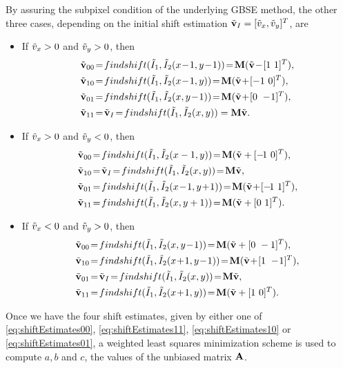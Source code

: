 By assuring the subpixel condition of the underlying GBSE method, the other three cases, depending on the initial shift estimation $\tilde{\mathbf{v}}_I = [\tilde{v}_x, \tilde{v}_y]^T$, are
\begin{itemize}
	\item If $\tilde{v}_x > 0$ and $\tilde{v}_y > 0$, then
	\begin{align}
	\nonumber \nbv_{00}\!&=\!findshift(\nI_1, \nI_2(x\!-\!1,y\!-\!1))\!=\!\bM(\nbv\!-\![1 \ 1]^T),\\ 
	\nonumber \nbv_{10}\!&=\!findshift(\nI_1, \nI_2(x\!-\!1,y))\!=\!\bM(\nbv\!+\![-1 \ 0]^T),\\
	\nonumber \nbv_{01}\!&=\!findshift(\nI_1, \nI_2(x,y\!-\!1))\!=\!\bM(\nbv\!+\![0 \ -\!1]^T),\\
	\nbv_{11}\!&=\!\nbv_I\!=\!findshift(\nI_1, \nI_2(x,y)) = \bM\nbv.
	\label{eq:shiftEstimates11}
	\end{align}
	
	\item If $\tilde{v}_x > 0$ and $\tilde{v}_y < 0$, then
	\begin{align}
	\nonumber \nbv_{00}\!&=\!findshift(\nI_1, \nI_2(x-1,y))\!=\!\bM(\nbv+ [-\!1 \ 0]^T),\\ 
	\nonumber \nbv_{10}\!&=\!\nbv_I\!=\!findshift(\nI_1, \nI_2(x,y))\!=\!\bM\nbv,\\
	\nonumber \nbv_{01}\!&=\!findshift(\nI_1, \nI_2(x\!-\!1,y\!+\!1))\!=\!\bM(\nbv\!+\![-\!1 \ 1]^T),\\
	\nbv_{11}\!&=\!findshift(\nI_1, \nI_2(x,y+1))\!=\!\bM(\nbv + [0 \ 1]^T).
	\label{eq:shiftEstimates10}
	\end{align}
	
	\item If $\tilde{v}_x < 0$ and $\tilde{v}_y > 0$, then
	\begin{align}
	\nonumber \nbv_{00}\!&=\!findshift(\nI_1, \nI_2(x,y\!-\!1))\!=\!\bM(\nbv+ [0 \ -1]^T),\\ 
	\nonumber \nbv_{10}\!&=\!findshift(\nI_1, \nI_2(x\!+\!1,y\!-\!1))\!=\!\bM(\nbv\!+\![1 \ -\!1]^T),\\
	\nonumber \nbv_{01}\!&=\!\nbv_I\!=\!findshift(\nI_1, \nI_2(x,y))\!=\!\bM\nbv,\\
	\nbv_{11}\!&=\!findshift(\nI_1, \nI_2(x\!+\!1,y))\!=\!\bM(\nbv + [1 \ 0]^T).
	\label{eq:shiftEstimates01}
	\end{align}
\end{itemize}
Once we have the four shift estimates, given by either one of \eqref{eq:shiftEstimates00}, \eqref{eq:shiftEstimates11}, \eqref{eq:shiftEstimates10} or \eqref{eq:shiftEstimates01}, a weighted least squares minimization scheme is used to compute $a, b$ and $c$, the values of the unbiased matrix $\mathbf{A}$. 

